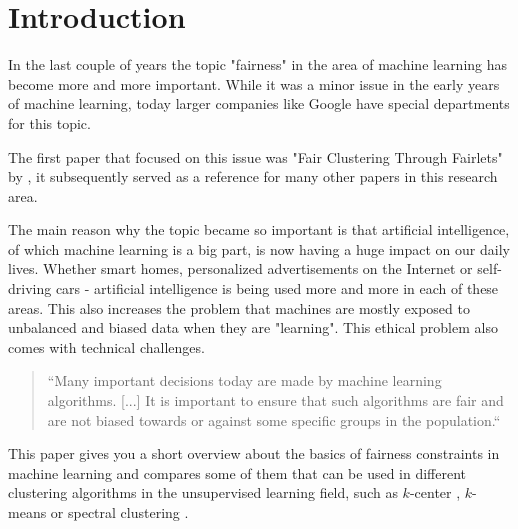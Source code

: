 \section{Introduction}

In the last couple of years the topic "fairness" in the area of machine learning has become more and more important. While it was a minor issue in the early years of machine learning, today larger companies like Google have special departments for this topic.

The first paper that focused on this issue was "Fair Clustering Through Fairlets" by \textcite{Chierichetti2018}, it subsequently served as a reference for many other papers in this research area.

The main reason why the topic became so important is that artificial intelligence, of which machine learning is a big part, is now having a huge impact on our daily lives. Whether smart homes, personalized advertisements on the Internet or self-driving cars - artificial intelligence is being used more and more in each of these areas. This also increases the problem that machines are mostly exposed to unbalanced and biased data when they are "learning". This ethical problem also comes with technical challenges.

\begin{quote}
    ``Many important decisions today are made by machine learning algorithms. [...] It is important to ensure that such algorithms are fair and are not biased towards or against some specific groups in the population.``
    
\autocite[1]{Bera2019}
\end{quote}


This paper gives you a short overview about the basics of fairness constraints in machine learning and compares some of them that can be used in different clustering algorithms in the unsupervised learning \autocite[]{Barlow1989} field, such as $k$-center \autocite[]{Chierichetti2018}, $k$-means \autocite[]{Schmidt2018} or spectral clustering \autocite[]{Kleindessner2019}.
